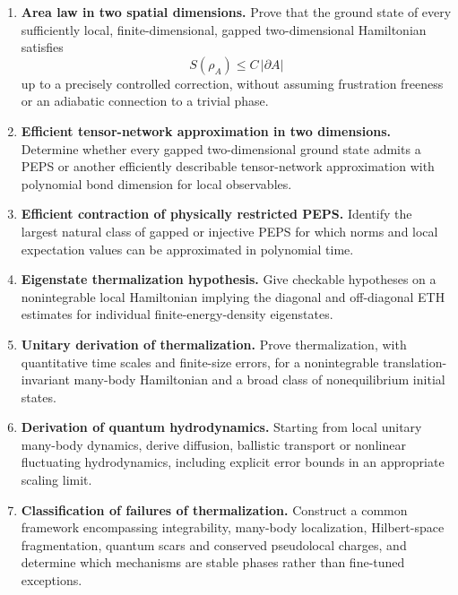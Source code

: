 \documentclass{article}
\begin{document}
\begin{enumerate}[label=\textbf{B\arabic*.},leftmargin=*]

\item \precise{} \textbf{Area law in two spatial dimensions.}
Prove that the ground state of every sufficiently local,
finite-dimensional, gapped two-dimensional Hamiltonian satisfies
\[
    S(\rho_A)\leq C\,|\partial A|
\]
up to a precisely controlled correction, without assuming frustration
freeness or an adiabatic connection to a trivial phase.

\item \precise{} \textbf{Efficient tensor-network approximation in two dimensions.}
Determine whether every gapped two-dimensional ground state admits a
PEPS or another efficiently describable tensor-network approximation
with polynomial bond dimension for local observables.

\item \precise{} \textbf{Efficient contraction of physically restricted PEPS.}
Identify the largest natural class of gapped or injective PEPS for which
norms and local expectation values can be approximated in polynomial
time.

\item \precise{} \textbf{Eigenstate thermalization hypothesis.}
Give checkable hypotheses on a nonintegrable local Hamiltonian implying
the diagonal and off-diagonal ETH estimates for individual
finite-energy-density eigenstates.

\item \precise{} \textbf{Unitary derivation of thermalization.}
Prove thermalization, with quantitative time scales and finite-size
errors, for a nonintegrable translation-invariant many-body Hamiltonian
and a broad class of nonequilibrium initial states.

\item \precise{} \textbf{Derivation of quantum hydrodynamics.}
Starting from local unitary many-body dynamics, derive diffusion,
ballistic transport or nonlinear fluctuating hydrodynamics, including
explicit error bounds in an appropriate scaling limit.

\item \formalism{} \textbf{Classification of failures of thermalization.}
Construct a common framework encompassing integrability, many-body
localization, Hilbert-space fragmentation, quantum scars and conserved
pseudolocal charges, and determine which mechanisms are stable phases
rather than fine-tuned exceptions.


\end{enumerate}
\end{document}
